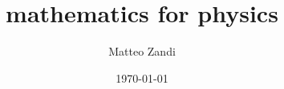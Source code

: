 \documentclass[a4paper, 12pt]{memoir}
\title{mathematics for physics}
\author{Matteo Zandi}
\date{\today}
\begin{document}
\frontmatter



\tableofcontents

\mainmatter



\backmatter

\nocite{ortolani}
\nocite{schuller}

\clearpage
{}
\printbibliography
\end{document}
